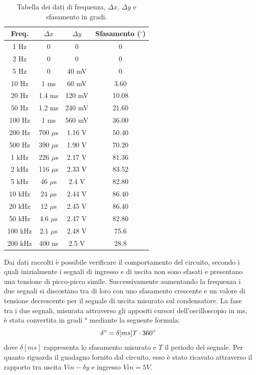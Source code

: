\begin{table}
    \centering
        \begin{tabular}{|c|c|c|c|}
        \hline
        Freq. & $\Delta x$ & $\Delta y$ & Sfasamento ($^\circ$) \\
        \hline
        1 Hz   & 0          & 0          & 0            \\
        2 Hz   & 0          & 0          & 0            \\
        5 Hz   & 0          & 40 mV      & 0            \\
        10 Hz  & 1 ms       & 60 mV      & 3.60          \\
        20 Hz  & 1.4 ms     & 120 mV     & 10.08        \\
        50 Hz  & 1.2 ms     & 240 mV     & 21.60         \\
        100 Hz & 1 ms       & 560 mV     & 36.00           \\
        200 Hz & 700 $\mu$s & 1.16 V     & 50.40         \\
        500 Hz & 390 $\mu$s & 1.90 V     & 70.20         \\
        1 kHz  & 226 $\mu$s & 2.17 V     & 81.36         \\
        2 kHz  & 116 $\mu$s & 2.33 V     & 83.52        \\
        5 kHz  & 46 $\mu$s  & 2.4 V      & 82.80         \\
        10 kHz & 24 $\mu$s  & 2.44 V     & 86.40         \\
        20 kHz & 12 $\mu$s  & 2.45 V     & 86.40         \\
        50 kHz & 4.6 $\mu$s & 2.47 V     & 82.80         \\
        100 kHz& 2.1 $\mu$s & 2.48 V     & 75.6         \\
        200 kHz& 400 ns     & 2.5 V      & 28.8         \\
        \hline
        \end{tabular}
    \caption{Tabella dei dati di frequenza, $\Delta x$, $\Delta y$ e    sfasamento in gradi.}
    \label{tab:dati_sfasamento}
\end{table}

Dai dati raccolti è possibile verificare il comportamento del circuito, secondo i quali inizialmente i segnali di ingresso e di uscita non sono sfasati e presentano una tensione di picco-picco simile. Successivamente aumentando la frequenza i due segnali si discostano tra di loro con uno sfasamento crescente e un valore di tensione decrescente per il segnale di uscita misurato sul condensatore. La fase tra i due segnali, misurata attraverso gli appositi cursori dell’oscilloscopio in ms, è stata convertita in gradi ° mediante la seguente formula:
$$\delta \degree= \delta [ms]T \cdot 360\degree$$
dove $\delta [ms]$ rappresenta lo sfasamento misurato e $T$ il periodo del segnale.
Per quanto riguarda il guadagno fornito dal circuito, esso è stato ricavato attraverso il rapporto tra uscita $Vin - \delta y$ e ingresso $Vin = 5 V$. 

